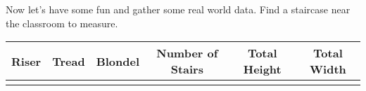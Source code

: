 \documentclass[handout,nooutcomes,noauthor,hints]{ximera}
\begin{document}
\mynewpage

\begin{question}
 Now let's have some fun and gather some real world data. Find a
 staircase near the classroom to measure. 
 \begin{center}
 \renewcommand{\arraystretch}{3}
 \begin{tabular}{|c|c|c|c|c|c|}
   \hline
  Riser & Tread  & Blondel  & Number of Stairs & Total Height & Total Width \\\hline
        &        &          &                  &              &             \\\hline 
\end{tabular}
\end{center}

\end{question}
\end{document}
